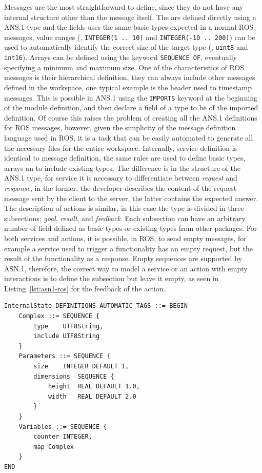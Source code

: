 Messages are the most straightforward to define, since they do not have any internal structure other than the message itself. The are defined directly using a ANS.1 type and the fields uses the same basic types expected in a normal ROS messages, value ranges (\eg, \texttt{INTEGER(1 .. 10)} and \texttt{INTEGER(-10 .. 200)}) can be used to automatically identify the correct size of the target type (\eg, \texttt{uint8} and \texttt{int16}). Arrays can be defined using the keyword \texttt{SEQUENCE OF}, eventually specifying a minimum and maximum size. One of the characteristics of ROS messages is their hierarchical definition, they can always include other messages defined in the workspace, one typical example is the header used to timestamp messages. This is possible in ANS.1 using the \texttt{IMPORTS} keyword at the beginning of the module definition, and then declare a field of a type to be of the imported definition. Of course this raises the problem of creating all the ANS.1 definitions for ROS messages, however, given the simplicity of the message definition language used in ROS, it is a task that can be easily automated to generate all the necessary files for the entire workspace. Internally, service definition is identical to message definition, the same rules are used to define basic types, arrays an to include existing types. The difference is in the structure of the ANS.1 type, for service it is necessary to differentiate between \textit{request} and \textit{response}, in the former, the developer describes the content of the request message sent by the client to the server, the latter contains the expected answer. The description of actions is similar, in this case the type is divided in three subsections: \textit{goal}, \textit{result}, and \textit{feedback}. Each subsection can have an arbitrary number of field defined as basic types or existing types from other packages. For both services and actions, it is possible, in ROS, to send empty messages, for example a service used to trigger a functionality has an empty request, but the result of the functionality as a response. Empty sequences are supported by ASN.1, therefore, the correct way to model a service or an action with empty interactions is to define the subsection but leave it empty, as seen in Listing~\ref{lst:asn1-ros} for the feedback of the action.

\begin{lstlisting}[float,caption={Internal state of a node modelled using ASN.1},label=lst:asn1-ros-is]
InternalState DEFINITIONS AUTOMATIC TAGS ::= BEGIN
	Complex ::= SEQUENCE {
		type	UTF8String,
		include	UTF8String
	}
	Parameters ::= SEQUENCE {
		size	INTEGER DEFAULT 1,
		dimensions	SEQUENCE {
			height	REAL DEFAULT 1.0,
			width	REAL DEFAULT 2.0
		}
	}
	Variables ::= SEQUENCE {
		counter	INTEGER,
		map	Complex
	}
END
\end{lstlisting}

